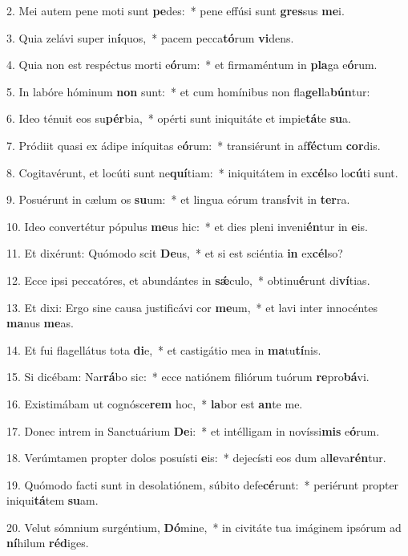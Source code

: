 2. Mei autem pene moti sunt \textbf{pe}des:~*  pene effúsi sunt \textbf{gres}sus \textbf{me}i.\

3. Quia zelávi super in\textbf{í}quos,~*  pacem pecca\textbf{tó}rum \textbf{vi}dens.\

4. Quia non est respéctus morti e\textbf{ó}rum:~*  et firmaméntum in \textbf{pla}ga e\textbf{ó}rum.\

5. In labóre hóminum \textbf{non} sunt:~*  et cum homínibus non fla\textbf{gel}la\textbf{bún}tur:\

6. Ideo ténuit eos su\textbf{pér}bia,~*  opérti sunt iniquitáte et impie\textbf{tá}te \textbf{su}a.\

7. Pródiit quasi ex ádipe iníquitas e\textbf{ó}rum:~*  transiérunt in af\textbf{féc}tum \textbf{cor}dis.\

8. Cogitavérunt, et locúti sunt ne\textbf{quí}tiam:~*  iniquitátem in ex\textbf{cél}so lo\textbf{cú}ti sunt.\

9. Posuérunt in cælum os \textbf{su}um:~*  et lingua eórum trans\textbf{í}vit in \textbf{ter}ra.\

10. Ideo convertétur pópulus \textbf{me}us hic:~*  et dies pleni inveni\textbf{én}tur in \textbf{e}is.\

11. Et dixérunt: Quómodo scit \textbf{De}us,~*  et si est sciéntia \textbf{in} ex\textbf{cél}so?\

12. Ecce ipsi peccatóres, et abundántes in \textbf{sǽ}culo,~*  obtinu\textbf{é}runt di\textbf{ví}tias.\

13. Et dixi: Ergo sine causa justificávi cor \textbf{me}um,~*  et lavi inter innocéntes \textbf{ma}nus \textbf{me}as.\

14. Et fui flagellátus tota \textbf{di}e,~*  et castigátio mea in \textbf{ma}tu\textbf{tí}nis.\

15. Si dicébam: Nar\textbf{rá}bo sic:~*  ecce natiónem filiórum tuórum \textbf{re}pro\textbf{bá}vi.\

16. Existimábam ut cognósce\textbf{rem} hoc,~*  \textbf{la}bor est \textbf{an}te me.\

17. Donec intrem in Sanctuárium \textbf{De}i:~*  et intélligam in novíssi\textbf{mis} e\textbf{ó}rum.\

18. Verúmtamen propter dolos posuísti \textbf{e}is:~*  dejecísti eos dum al\textbf{le}va\textbf{rén}tur.\

19. Quómodo facti sunt in desolatiónem, súbito defe\textbf{cé}runt:~*  periérunt propter iniqui\textbf{tá}tem \textbf{su}am.\

20. Velut sómnium surgéntium, \textbf{Dó}mine,~*  in civitáte tua imáginem ipsórum ad \textbf{ní}hilum \textbf{réd}iges.\

